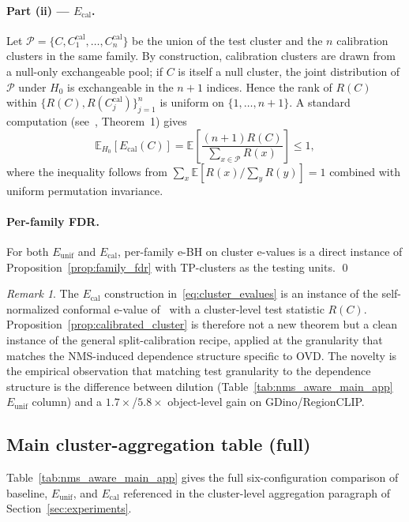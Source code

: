 \documentclass{article}
\theoremstyle{remark}
\newtheorem{remark}{Remark}
\newcommand{\1}{\mathbf{1}}
\begin{document}
\paragraph{Part (ii) --- $E_{\mathrm{cal}}$.}
Let $\mathcal{P}=\{C, C^{\mathrm{cal}}_1,\dots,C^{\mathrm{cal}}_n\}$ be
the union of the test cluster and the $n$ calibration clusters in the
same family. By construction, calibration clusters are drawn from a
null-only exchangeable pool; if $C$ is itself a null cluster, the joint
distribution of $\mathcal{P}$ under $H_0$ is exchangeable in the $n+1$
indices. Hence the rank of $R(C)$ within $\{R(C),R(C^{\mathrm{cal}}_j)\}_{j=1}^{n}$
is uniform on $\{1,\dots,n+1\}$. A standard computation
(see~\citet{vovk2021values}, Theorem~1) gives
\[
\mathbb{E}_{H_0}[E_{\mathrm{cal}}(C)]
=\mathbb{E}\!\left[\frac{(n+1)R(C)}{\sum_{x\in\mathcal{P}}R(x)}\right]\le 1,
\]
where the inequality follows from $\sum_{x}\mathbb{E}[R(x)/\sum_y R(y)]=1$
combined with uniform permutation invariance.

\paragraph{Per-family FDR.}
For both $E_{\mathrm{unif}}$ and $E_{\mathrm{cal}}$, per-family e-BH on
cluster e-values is a direct instance of Proposition~\ref{prop:family_fdr}
with TP-clusters as the testing units. \qed

\begin{remark}
The $E_{\mathrm{cal}}$ construction in~\eqref{eq:cluster_evalues} is an instance of the
self-normalized conformal e-value of~\citet{vovk2021values} with a
cluster-level test statistic $R(C)$. Proposition~\ref{prop:calibrated_cluster}
is therefore not a new theorem but a clean instance of the general
split-calibration recipe, applied at the granularity that matches the
NMS-induced dependence structure specific to OVD. The novelty is the
empirical observation that matching test granularity to the dependence
structure is the difference between dilution
(Table~\ref{tab:nms_aware_main_app} $E_{\mathrm{unif}}$ column) and a
$1.7\times$/$5.8\times$ object-level gain on GDino/RegionCLIP.
\end{remark}

\subsection{Main cluster-aggregation table (full)}
\label{app:nms_aware_main_table}

Table~\ref{tab:nms_aware_main_app} gives the full six-configuration
comparison of baseline, $E_{\mathrm{unif}}$, and $E_{\mathrm{cal}}$
referenced in the cluster-level aggregation paragraph of
Section~\ref{sec:experiments}.
\end{document}
